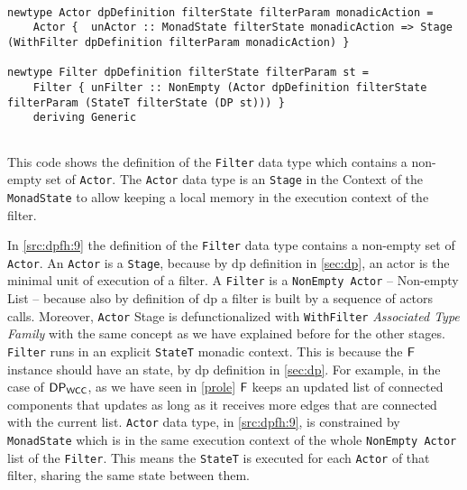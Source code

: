 \begin{listing}[htp!]
  \begin{verbatim}

newtype Actor dpDefinition filterState filterParam monadicAction =
    Actor {  unActor :: MonadState filterState monadicAction => Stage (WithFilter dpDefinition filterParam monadicAction) }

newtype Filter dpDefinition filterState filterParam st =
    Filter { unFilter :: NonEmpty (Actor dpDefinition filterState filterParam (StateT filterState (DP st))) }
    deriving Generic
    
  \end{verbatim}
  \caption[{[\texttt{Stage.hs}] Filter / Actor Data Type}]{This code shows the definition of the \texttt{Filter} data type which contains a non-empty set of \texttt{Actor}. The \texttt{Actor} data type is an \texttt{Stage} in the Context of the \texttt{MonadState} to allow keeping a local memory in the execution context of the filter.}
  \label{src:dpfh:9}
\end{listing}

In \autoref{src:dpfh:9} the definition of the \texttt{Filter} data type contains a non-empty set of \texttt{Actor}.
An \texttt{Actor} is a \texttt{Stage}, because by \acrshort{dp} definition in \autoref{sec:dp}, an actor is the minimal unit of execution of a filter. 
A \texttt{Filter} is a \texttt{NonEmpty Actor} -- Non-empty List -- because also by definition of \acrshort{dp} a filter is built by a sequence of actors calls. 
Moreover, \texttt{Actor} Stage is defunctionalized with \texttt{WithFilter} \emph{Associated Type Family} with the same concept as we have explained before for the other stages. 
\texttt{Filter} runs in an explicit \texttt{StateT} monadic context. This is because the $\mathsf{F}$ instance should have an state, by \acrshort{dp} definition in \autoref{sec:dp}.
For example, in the case of $\mathsf{DP_{WCC}}$, as we have seen in \autoref{prole} $\mathsf{F}$ keeps an updated list of connected components that updates as long as it receives more edges that are connected with the current list.
\texttt{Actor} data type, in \autoref{src:dpfh:9}, is constrained by \texttt{MonadState} which is in the same execution context of the whole \texttt{NonEmpty Actor} list of the \texttt{Filter}. 
This means the \texttt{StateT} is executed for each \texttt{Actor} of that filter, sharing the same state between them. 

